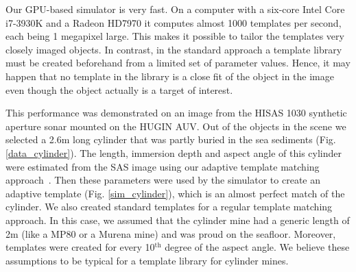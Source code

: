 \documentclass[10pt,journal,draftclsnofoot,onecolumn]{IEEEtran}
\let\MYoriglatexcaption\caption               %
\renewcommand{\caption}[2][\relax]{\MYoriglatexcaption[#2]{#2}}
\newcommand\1{\vec 1}
\begin{document}
% 
% 




% 
% 

Our GPU-based simulator is very fast. On a computer with a six-core Intel Core i7-3930K and a Radeon HD7970 it computes almost 1000 templates per second, each being 1 megapixel large. This makes it possible to tailor the templates very closely imaged objects. In contrast, in the standard approach a template library must be created beforehand from a limited set of parameter values. Hence, it may happen that no template in the library is a close fit of the object in the image even though the object actually is a target of interest.

This performance was demonstrated on an image from the HISAS 1030 synthetic aperture sonar mounted on the HUGIN AUV. Out of the objects in the scene we selected a 2.6\;m long cylinder that was partly buried in the sea sediments (Fig. \ref{data_cylinder}). The length, immersion depth and aspect angle of this cylinder were estimated from the SAS image using our  adaptive template matching approach~\cite{Midelfart2010}.  Then these parameters were used by the simulator to create an adaptive template (Fig. \ref{sim_cylinder}), which is an almost perfect match of the cylinder. We also created standard templates for a regular template matching approach. In this case, we assumed that the cylinder mine had a generic length of 2\;m (like a MP80 or a Murena mine) and was proud on the seafloor. Moreover, templates were created for every 10$^\text{th}$ degree of the aspect angle. We believe these assumptions to be typical for a template library for cylinder mines. 
\end{document}
